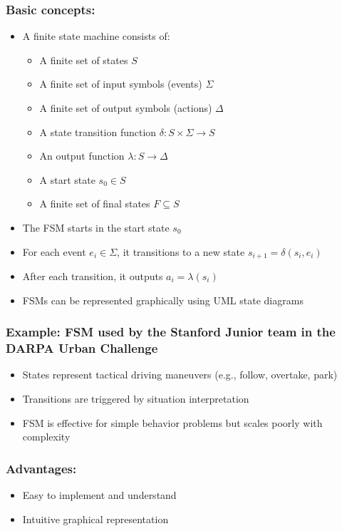 \subsubsection*{Basic concepts:}
\begin{itemize}
    \item A finite state machine consists of:
          \begin{itemize}
              \item A finite set of states $S$
              \item A finite set of input symbols (events) $\Sigma$
              \item A finite set of output symbols (actions) $\Delta$
              \item A state transition function $\delta:S \times \Sigma \to S$
              \item An output function $\lambda:S \to \Delta$
              \item A start state $s_0 \in S$
              \item A finite set of final states $F \subseteq S$
          \end{itemize}
    \item The FSM starts in the start state $s_0$
    \item For each event $e_i \in \Sigma$, it transitions to a new state $s_{i+1} = \delta(s_i, e_i)$
    \item After each transition, it outputs $a_i = \lambda(s_i)$
    \item FSMs can be represented graphically using UML state diagrams
\end{itemize}

\subsubsection*{Example: FSM used by the Stanford Junior team in the DARPA Urban Challenge}
\begin{itemize}
    \item States represent tactical driving maneuvers (e.g., follow, overtake, park)
    \item Transitions are triggered by situation interpretation
    \item FSM is effective for simple behavior problems but scales poorly with complexity
\end{itemize}

\subsubsection*{Advantages:}
\begin{itemize}
    \item Easy to implement and understand
    \item Intuitive graphical representation
\end{itemize}

